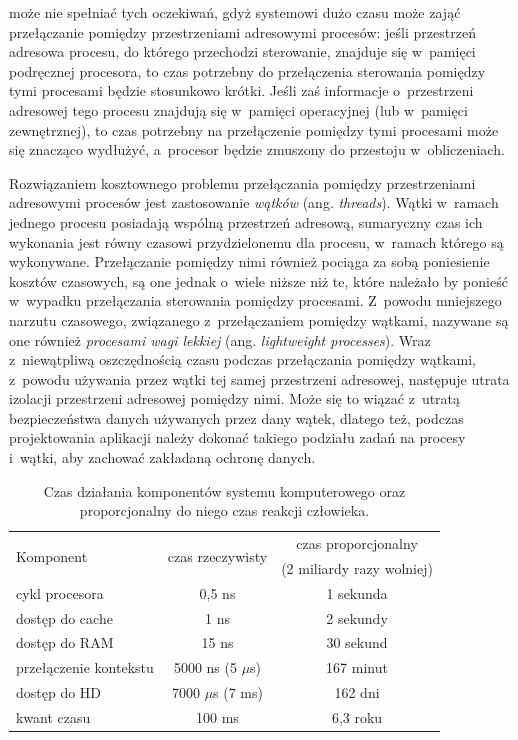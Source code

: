 \documentclass[11pt,makeidx]{mwart}
\begin{document}
	może nie spełniać tych oczekiwań, gdyż systemowi dużo czasu może zająć przełączanie pomiędzy przestrzeniami adresowymi procesów:
	jeśli przestrzeń adresowa procesu, do którego przechodzi sterowanie, znajduje się w~pamięci podręcznej procesora, to czas potrzebny do 
	przełączenia sterowania pomiędzy tymi procesami będzie stosunkowo krótki. Jeśli zaś informacje o~przestrzeni adresowej tego procesu znajdują się
	w~pamięci operacyjnej (lub w~pamięci zewnętrznej), to czas potrzebny na przełączenie pomiędzy tymi procesami może się znacząco wydłużyć,
	a~procesor będzie zmuszony do przestoju w~obliczeniach.
\par
%
\indent
	Rozwiązaniem kosztownego problemu przełączania pomiędzy przestrzeniami adresowymi procesów jest zastosowanie \emph{wątków} (ang. \emph{threads}).
	Wątki w~ramach jednego procesu posiadają wspólną przestrzeń adresową, sumaryczny czas ich wykonania jest równy czasowi przydzielonemu dla 
	procesu, w~ramach którego są wykonywane. Przełączanie pomiędzy nimi również pociąga za sobą poniesienie kosztów czasowych, są one jednak
	o~wiele niższe niż te, które należało by ponieść w~wypadku przełączania sterowania pomiędzy procesami. Z~powodu mniejszego narzutu czasowego,
	związanego z~przełączaniem pomiędzy wątkami, nazywane są one również \emph{procesami wagi lekkiej} (ang. \emph{lightweight processes}).
	Wraz z~niewątpliwą oszczędnością czasu podczas przełączania pomiędzy wątkami, z~powodu używania przez wątki tej samej przestrzeni adresowej,
	następuje utrata izolacji przestrzeni adresowej pomiędzy nimi. Może się to wiązać z~utratą bezpieczeństwa danych używanych przez dany wątek,
	dlatego też, podczas projektowania aplikacji należy dokonać takiego podziału zadań na procesy i~wątki, aby zachować zakładaną ochronę danych.
\par
%
\indent
	\begin{table}[h]
	\centering
	\begin{tabular}{|l|c|c|} \hline
		\multirow{2}{*}{Komponent} & \multirow{2}{*}{czas rzeczywisty}	& czas proporcjonalny \\ 
					  &                   & (2 miliardy razy wolniej) \\ \hline
		cykl procesora	& 0,5 ns & 1 sekunda \\\hline
		dostęp do cache & 1 ns & 2 sekundy \\\hline
		dostęp do RAM	  & 15 ns & 30 sekund \\\hline
		przełączenie kontekstu & 5000 ns (5 $\mu$s) & 167 minut \\\hline
		dostęp do HD		& 7000 $\mu$s (7 ms) & 162 dni \\\hline
		kwant czasu 		& 100 ms	& 6,3 roku \\\hline
	\end{tabular}
	\caption{
		Czas działania komponentów systemu komputerowego oraz proporcjonalny do niego czas reakcji człowieka.
	}
	\label{tab:timecomp}
	\end{table}
\end{document}
